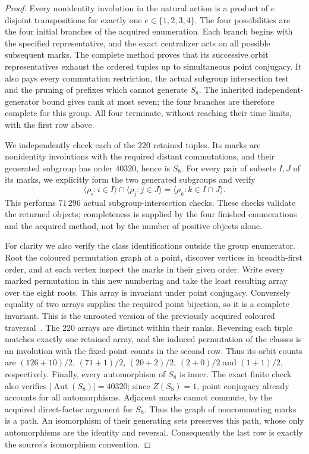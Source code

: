 \documentclass[10pt,a4paper]{article}
\begin{document}
\begin{proof}
Every nonidentity involution in the natural action is a product of
$e$ disjoint transpositions for exactly one $e\in\{1,2,3,4\}$.
The four possibilities are the four initial branches of the acquired
enumeration.  Each branch begins with the specified representative,
and the exact centralizer acts on all possible subsequent marks.
The complete method proves that its successive orbit representatives
exhaust the ordered tuples up to simultaneous point conjugacy.  It also
pays every commutation restriction, the actual subgroup intersection
test and the pruning of prefixes which cannot generate $S_8$.
The inherited independent-generator bound gives rank at most seven;
the four branches are therefore complete for this group.  All four
terminate, without reaching their time limits, with the first row above.

We independently check each of the 220 retained tuples.  Its marks are
nonidentity involutions with the required distant commutations, and their
generated subgroup has order $40320$, hence is $S_8$.  For every pair of
subsets $I,J$ of its marks, we explicitly form the two generated subgroups
and verify
\[
 \langle\rho_i:i\in I\rangle\cap\langle\rho_j:j\in J\rangle
 =\langle\rho_k:k\in I\cap J\rangle.
\]
This performs $71\,296$ actual subgroup-intersection checks.  These
checks validate the returned objects; completeness is supplied by the
four finished enumerations and the acquired method, not by the number
of positive objects alone.

For clarity we also verify the class identifications outside the group
enumerator.  Root the coloured permutation graph at a point, discover
vertices in breadth-first order, and at each vertex inspect the marks
in their given order.  Write every marked permutation in this new
numbering and take the least resulting array over the eight roots.
This array is invariant under point conjugacy.  Conversely equality of
two arrays supplies the required point bijection, so it is a complete
invariant.  This is the unrooted version of the previously acquired
coloured traversal~\cite{balanced}.  The 220 arrays are distinct within
their ranks.  Reversing each tuple matches exactly one retained array,
and the induced permutation of the classes is an involution with the
fixed-point counts in the second row.  Thus its orbit counts are
$(126+10)/2$, $(71+1)/2$, $(20+2)/2$, $(2+0)/2$ and $(1+1)/2$,
respectively.  Finally, every automorphism of $S_8$ is inner.  The exact
finite check also verifies $|\operatorname{Aut}(S_8)|=40320$; since
$Z(S_8)=1$, point conjugacy already accounts for all automorphisms.
Adjacent marks cannot commute, by the acquired direct-factor argument
for $S_8$.  Thus the graph of noncommuting marks is a path.  An
isomorphism of their generating sets preserves this path, whose only
automorphisms are the identity and reversal.  Consequently the last row
is exactly the source's isomorphism convention.
\end{proof}
\end{document}

